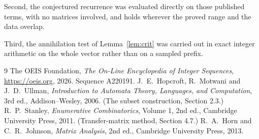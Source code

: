 \documentclass[11pt,a4paper]{article}
\theoremstyle{plain}
\theoremstyle{definition}
\begin{document}
Second, the conjectured recurrence was evaluated directly on those published terms, with no
matrices involved, and holds wherever the proved range and the data overlap.

Third, the annihilation test of Lemma~\ref{lem:crit} was carried out in exact integer
arithmetic on the whole vector rather than on a sampled prefix.

\begin{thebibliography}{9}
 The OEIS Foundation, \emph{The On-Line Encyclopedia of Integer
Sequences}, \url{https://oeis.org}, 2026. Sequence A220191.
 J.~E.~Hopcroft, R.~Motwani and J.~D.~Ullman, \emph{Introduction to Automata
Theory, Languages, and Computation}, 3rd ed., Addison--Wesley, 2006. (The subset
construction, Section 2.3.)
 R.~P.~Stanley, \emph{Enumerative Combinatorics}, Volume 1, 2nd ed.,
Cambridge University Press, 2011. (Transfer-matrix method, Section 4.7.)
 R.~A.~Horn and C.~R.~Johnson, \emph{Matrix Analysis}, 2nd ed., Cambridge
University Press, 2013.
\end{thebibliography}
\end{document}
